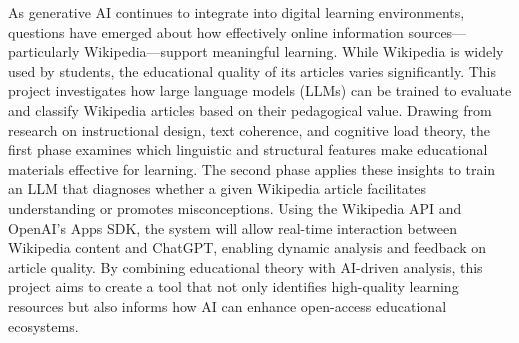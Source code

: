 As generative AI continues to integrate into digital learning environments, questions have 
emerged about how effectively online information sources—particularly Wikipedia—support 
meaningful learning. While Wikipedia is widely used by students, the educational quality of 
its articles varies significantly. This project investigates how large language models (LLMs) 
can be trained to evaluate and classify Wikipedia articles based on their pedagogical value. 
Drawing from research on instructional design, text coherence, and cognitive load theory, the 
first phase examines which linguistic and structural features make educational materials effective 
for learning. The second phase applies these insights to train an LLM that diagnoses whether a 
given Wikipedia article facilitates understanding or promotes misconceptions. Using the Wikipedia 
API and OpenAI’s Apps SDK, the system will allow real-time interaction between Wikipedia content and 
ChatGPT, enabling dynamic analysis and feedback on article quality. By combining educational theory 
with AI-driven analysis, this project aims to create a tool that not only identifies high-quality 
learning resources but also informs how AI can enhance open-access educational ecosystems.
